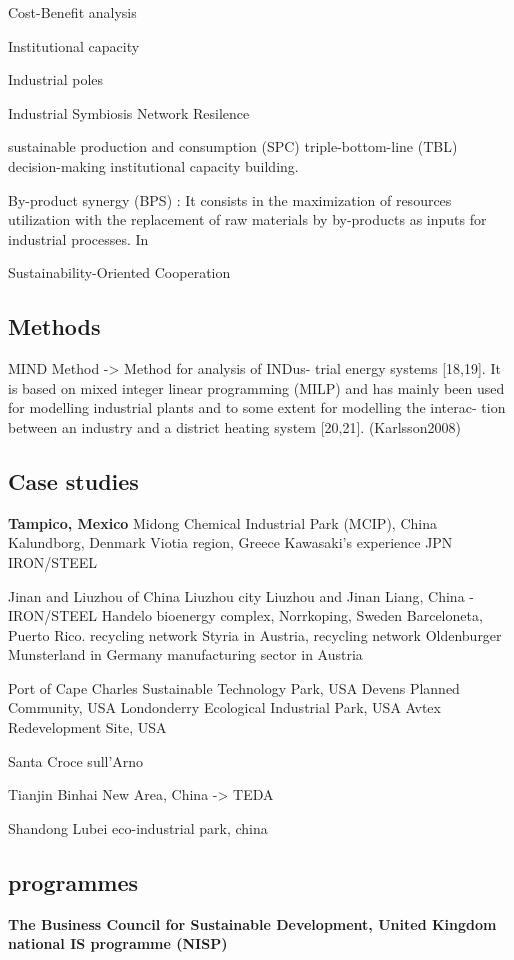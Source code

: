 Cost-Benefit analysis

Institutional capacity

Industrial poles

Industrial Symbiosis Network
Resilence

sustainable production and consumption (SPC)
triple-bottom-line (TBL) decision-making
institutional capacity building.

By-product synergy (BPS) : It consists in the maximization of resources utilization with the replacement of raw materials by by-products as inputs for industrial processes. In

Sustainability-Oriented Cooperation

\subsection{Methods}
MIND Method -> Method for analysis of INDus-
trial energy systems [18,19]. It is based on mixed integer linear programming (MILP) and has mainly been used for modelling industrial plants and to some extent for modelling the interac- tion between an industry and a district heating system [20,21].
(Karlsson2008)

\subsection{Case studies}
\textbf{Tampico, Mexico}
Midong Chemical Industrial Park (MCIP), China
Kalundborg, Denmark
Viotia region, Greece
Kawasaki’s experience JPN IRON/STEEL

Jinan and Liuzhou of China
Liuzhou city
Liuzhou and Jinan Liang, China - IRON/STEEL
Handelo bioenergy complex, Norrkoping, Sweden
Barceloneta, Puerto Rico. 
recycling network Styria in Austria, 
recycling network Oldenburger Munsterland in Germany
manufacturing sector in Austria

Port of Cape Charles Sustainable Technology Park, USA
Devens Planned Community, USA
Londonderry Ecological Industrial Park, USA
Avtex Redevelopment Site, USA

Santa Croce sull’Arno

Tianjin Binhai New Area, China -> TEDA


Shandong Lubei eco-industrial park, china


\subsection{programmes}
\textbf{The Business Council for Sustainable Development, United Kingdom
national IS programme (NISP)}

